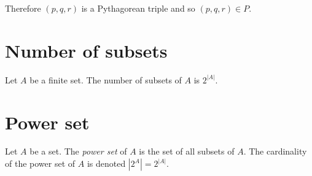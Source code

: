 \documentclass[12pt]{article}
\begin{document}
Therefore $(p,q,r)$ is a Pythagorean triple and so $(p,q,r)\in P$.
\section*{Number of subsets}
Let $A$ be a finite set. The number of subsets of $A$ is $2^{|A|}$.
\section*{Power set}
Let $A$ be a set. The \textit{power set} of $A$ is the set of all subsets of $A$. The cardinality of the power set of $A$ is denoted $|2^A|=2^{|A|}$.
\end{document}
